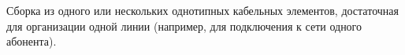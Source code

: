 Сборка из одного или нескольких однотипных кабельных элементов,
достаточная для организации одной линии (например, для
подключения к сети одного абонента).